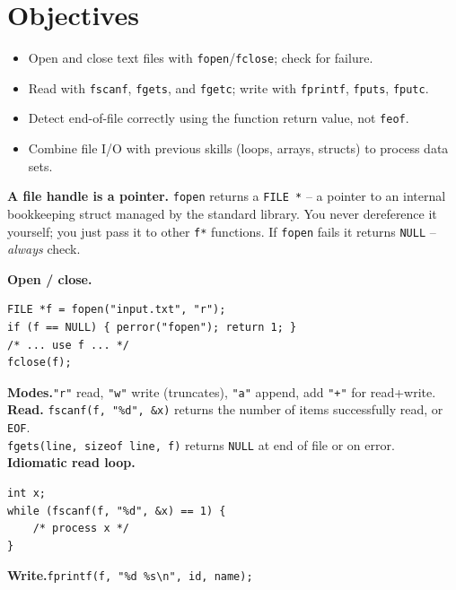 \documentclass[11pt]{article}
\begin{document}
\labheader

\section*{Objectives}
\begin{itemize}[leftmargin=*,nosep]
  \item Open and close text files with \texttt{fopen}/\texttt{fclose}; check for failure.
  \item Read with \texttt{fscanf}, \texttt{fgets}, and \texttt{fgetc}; write with \texttt{fprintf}, \texttt{fputs}, \texttt{fputc}.
  \item Detect end-of-file correctly using the function return value, not \texttt{feof}.
  \item Combine file I/O with previous skills (loops, arrays, structs) to process data sets.
\end{itemize}

\begin{summary}
\textbf{A file handle is a pointer.} \texttt{fopen} returns a \texttt{FILE *} -- a pointer
to an internal bookkeeping struct managed by the standard library. You never dereference it
yourself; you just pass it to other \texttt{f*} functions. If \texttt{fopen} fails it returns
\texttt{NULL} -- \emph{always} check.

\textbf{Open / close.}
\begin{lstlisting}
FILE *f = fopen("input.txt", "r");
if (f == NULL) { perror("fopen"); return 1; }
/* ... use f ... */
fclose(f);
\end{lstlisting}

\textbf{Modes.}\quad \texttt{"r"} read, \texttt{"w"} write (truncates), \texttt{"a"} append, add \texttt{"+"} for read+write.\\

\textbf{Read.}\quad
\texttt{fscanf(f, "\%d", \&x)} returns the number of items successfully read, or \texttt{EOF}.\\
\texttt{fgets(line, sizeof line, f)} returns \texttt{NULL} at end of file or on error.\\

\textbf{Idiomatic read loop.}
\begin{lstlisting}
int x;
while (fscanf(f, "%d", &x) == 1) {
    /* process x */
}
\end{lstlisting}

\textbf{Write.}\quad \texttt{fprintf(f, "\%d \%s\textbackslash n", id, name);}
\end{summary}
\end{document}

